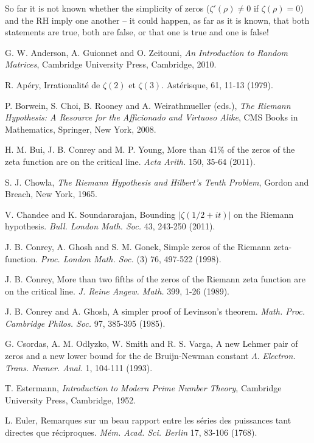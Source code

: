 \documentclass[11pt]{article}
\begin{document}
So far it is not known whether the simplicity of zeros ($\zeta'(\rho) \neq 0$ if $\zeta(\rho) = 0$) and the RH imply one another – it could happen, as far as it is known, that both statements are true, both are false, or that one is true and one is false!

\begin{thebibliography}{99}
 G. W. Anderson, A. Guionnet and O. Zeitouni, \textit{An Introduction to Random Matrices}, Cambridge University Press, Cambridge, 2010.

 R. Apéry, Irrationalité de $\zeta(2)$ et $\zeta(3)$. Astérisque, 61, 11-13 (1979).

 P. Borwein, S. Choi, B. Rooney and A. Weirathmueller (eds.), \textit{The Riemann Hypothesis: A Resource for the Afficionado and Virtuoso Alike}, CMS Books in Mathematics, Springer, New York, 2008.

 H. M. Bui, J. B. Conrey and M. P. Young, More than 41\% of the zeros of the zeta function are on the critical line. \textit{Acta Arith.} 150, 35-64 (2011).

 S. J. Chowla, \textit{The Riemann Hypothesis and Hilbert's Tenth Problem}, Gordon and Breach, New York, 1965.

 V. Chandee and K. Soundararajan, Bounding $|\zeta(1/2+it)|$ on the Riemann hypothesis. \textit{Bull. London Math. Soc.} 43, 243-250 (2011).

 J. B. Conrey, A. Ghosh and S. M. Gonek, Simple zeros of the Riemann zeta-function. \textit{Proc. London Math. Soc.} (3) 76, 497-522 (1998).

 J. B. Conrey, More than two fifths of the zeros of the Riemann zeta function are on the critical line. \textit{J. Reine Angew. Math.} 399, 1-26 (1989).

 J. B. Conrey and A. Ghosh, A simpler proof of Levinson's theorem. \textit{Math. Proc. Cambridge Philos. Soc.} 97, 385-395 (1985).

 G. Csordas, A. M. Odlyzko, W. Smith and R. S. Varga, A new Lehmer pair of zeros and a new lower bound for the de Bruijn-Newman constant $\Lambda$. \textit{Electron. Trans. Numer. Anal.} 1, 104-111 (1993).

 T. Estermann, \textit{Introduction to Modern Prime Number Theory}, Cambridge University Press, Cambridge, 1952.

 L. Euler, Remarques sur un beau rapport entre les séries des puissances tant directes que réciproques. \textit{Mém. Acad. Sci. Berlin} 17, 83-106 (1768).


\end{thebibliography}
\end{document}
